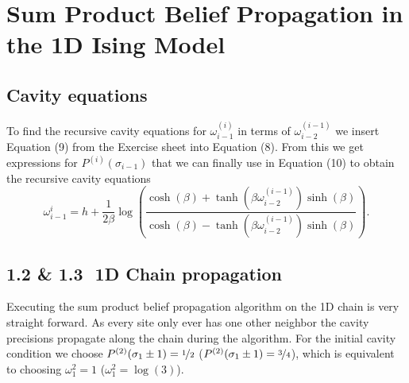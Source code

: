 \documentclass[main.tex]{subfiles}
\begin{document}
\section{Sum Product Belief Propagation in the 1D Ising Model}


\subsection{Cavity equations}

To find the recursive cavity equations for $\omega_{ i-1 }^{(i)}$ in terms of 
$\omega_{ i-2 } ^{(i-1)}$ we insert Equation (9) from the Exercise sheet into
Equation (8). From this we get expressions for $P^{(i)}(\sigma_{ i-1 } )$ that we
can finally use in Equation (10) to obtain the recursive cavity equations 
\[
    \omega^{i}_{ i-1 } = h + \frac{1}{2\beta} \log( 
    \frac{
        \cosh( \beta  ) + \tanh( \beta \omega_{ i-2 } ^{(i-1)} ) \sinh( \beta )  
    }{
        \cosh( \beta  ) - \tanh( \beta \omega_{ i-2 } ^{(i-1)} ) \sinh( \beta )  
    }
    ) 
.\] 


\subsection*{1.2 \& 1.3\,\, 1D Chain propagation}
Executing the sum product belief propagation algorithm on the 1D chain is very straight forward.
As every site only ever has one other neighbor the cavity precisions propagate along the chain during the algorithm.
For the initial cavity condition we choose $P^{(2)}(\sigma_{ 1 } \pm 1) = \nicefrac{1}{2}$ ($P^{(2)}(\sigma_{ 1 } \pm 1) = \nicefrac{3}{4}$),
which is equivalent to choosing $\omega_{ 1 } ^{2} = 1$ ($\omega_{ 1 } ^{2} = \log( 3 ) $).
\end{document}
